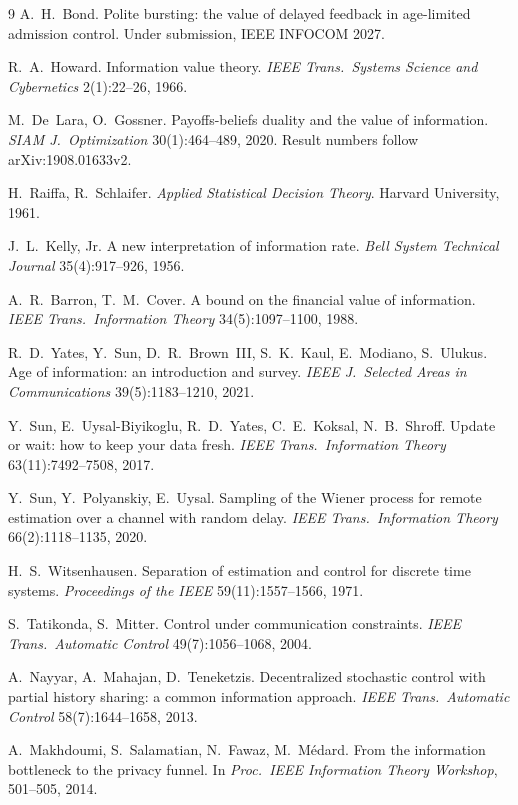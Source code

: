 \documentclass[11pt]{article}
\begin{document}
\begin{thebibliography}{9}
A.~H.~Bond. Polite bursting: the value of delayed feedback in age-limited
admission control. Under submission, IEEE INFOCOM 2027.

R.~A.~Howard. Information value theory.
\emph{IEEE Trans.\ Systems Science and Cybernetics} 2(1):22--26, 1966.

M.~De~Lara, O.~Gossner. Payoffs-beliefs duality and the value of
information. \emph{SIAM J.\ Optimization} 30(1):464--489, 2020.
Result numbers follow arXiv:1908.01633v2.

H.~Raiffa, R.~Schlaifer. \emph{Applied Statistical Decision Theory}.
Harvard University, 1961.

J.~L.~Kelly, Jr. A new interpretation of information rate.
\emph{Bell System Technical Journal} 35(4):917--926, 1956.

A.~R.~Barron, T.~M.~Cover. A bound on the financial value of information.
\emph{IEEE Trans.\ Information Theory} 34(5):1097--1100, 1988.

R.~D.~Yates, Y.~Sun, D.~R.~Brown~III, S.~K.~Kaul, E.~Modiano, S.~Ulukus.
Age of information: an introduction and survey.
\emph{IEEE J.\ Selected Areas in Communications} 39(5):1183--1210, 2021.

Y.~Sun, E.~Uysal-Biyikoglu, R.~D.~Yates, C.~E.~Koksal, N.~B.~Shroff.
Update or wait: how to keep your data fresh.
\emph{IEEE Trans.\ Information Theory} 63(11):7492--7508, 2017.

Y.~Sun, Y.~Polyanskiy, E.~Uysal. Sampling of the Wiener process for remote
estimation over a channel with random delay. \emph{IEEE Trans.\
Information Theory} 66(2):1118--1135, 2020.

H.~S.~Witsenhausen. Separation of estimation and control for discrete time
systems. \emph{Proceedings of the IEEE} 59(11):1557--1566, 1971.

S.~Tatikonda, S.~Mitter. Control under communication constraints.
\emph{IEEE Trans.\ Automatic Control} 49(7):1056--1068, 2004.

A.~Nayyar, A.~Mahajan, D.~Teneketzis. Decentralized stochastic control with
partial history sharing: a common information approach.
\emph{IEEE Trans.\ Automatic Control} 58(7):1644--1658, 2013.

A.~Makhdoumi, S.~Salamatian, N.~Fawaz, M.~M\'edard. From the information
bottleneck to the privacy funnel. In \emph{Proc.\ IEEE Information
Theory Workshop}, 501--505, 2014.


\end{thebibliography}
\end{document}
